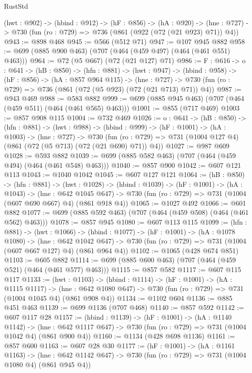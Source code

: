 \begin{lexlean}{RustStd}
\begin{coremodule}
{\begin{coremodule}
{  (hwt : @902) ->
  (hbind : @912) ->
  (hF : @856) ->
  (hA : @920) ->
  (hne : @727) -> @730 (fun (ro : @729) => @736 (@861 (@922 (@72 (@21 @923) @71)) @4))
@943 := @898 @468
@945 := @566 (@512 @71)
@947 := @107 @945 @882
@958 := @699 (@885 @900 @463) (@707 (@464 (@459 @497) (@464 (@461 @551) @463)))
@964 := @72 (@5 @667) (@72 (@21 @127) @71)
@986 := {F : @616} ->
  {o : @641} ->
  (hB : @850) ->
  (hfn : @881) ->
  (hwt : @947) ->
  (hbind : @958) ->
  (hF : @856) ->
  (hA : @857 @964 @115) ->
  (hne : @727) -> @730 (fun (ro : @729) => @736 (@861 (@72 (@5 @923) (@72 (@21 @713) @71)) @4))
@987 := @943 @469
@988 := @583 @882
@999 := @699 (@885 @945 @463) (@707 (@464 (@459 @511) (@464 (@461 @565) @463)))
@1001 := @855 (@717 @469)
@1003 := @857 @908 @115
@1004 := @732 @469
@1026 := {o : @641} ->
  (hB : @850) ->
  (hfn : @881) ->
  (hwt : @988) ->
  (hbind : @999) ->
  (hF : @1001) ->
  (hA : @1003) ->
  (hne : @727) ->
  @730 (fun (ro : @729) => @731 (@1004 @127 @4) (@861 (@72 (@5 @713) (@72 (@21 @690) @71)) @4))
@1027 := @987 @609
@1028 := @593 @882
@1039 := @699 (@885 @582 @463) (@707 (@464 (@459 @494) (@464 (@461 @548) @463)))
@1040 := @857 @900
@1042 := @607 @121 @113
@1043 := @1040 @1042
@1045 := @607 @127 @121
@1064 := (hB : @850) ->
  (hfn : @881) ->
  (hwt : @1028) ->
  (hbind : @1039) ->
  (hF : @1001) ->
  (hA : @1043) ->
  (hne : @642 @1045 @647) ->
  @730 (fun (ro : @729) => @731 (@1004 (@607 @690 @667) @4) (@861 @918 @4))
@1065 := @1027 @492
@1066 := @601 @882
@1077 := @699 (@885 @592 @463) (@707 (@464 (@459 @508) (@464 (@461 @562) @463)))
@1078 := @857 @945
@1080 := @607 @113 @115
@1099 := (hfn : @881) ->
  (hwt : @1066) ->
  (hbind : @1077) ->
  (hF : @1001) ->
  (hA : @1078 @1080) ->
  (hne : @642 @1042 @647) ->
  @730 (fun (ro : @729) => @731 (@1004 (@607 @667 @127) @4) (@861 @964 @4))
@1102 := @1065 (@428 @674 @851)
@1103 := @605 @882
@1114 := @699 (@885 @600 @463) (@707 (@464 (@459 @521) (@464 (@461 @577) @463)))
@1115 := @857 @582
@1117 := @607 @115 @117
@1133 := (hwt : @1103) ->
  (hbind : @1114) ->
  (hF : @1001) ->
  (hA : @1115 @1117) ->
  (hne : @642 @1080 @647) -> @730 (fun (ro : @729) => @731 (@1004 @1045 @4) (@861 @908 @4))
@1134 := @1102 @604
@1136 := @885 @451 @463
@1139 := @699 @1136 (@707 @468)
@1140 := @857 @592
@1142 := @607 @117 @28
@1157 := (hbind : @1139) ->
  (hF : @1001) ->
  (hA : @1140 @1142) ->
  (hne : @642 @1117 @647) -> @730 (fun (ro : @729) => @731 (@1004 @1042 @4) (@861 @900 @4))
@1160 := @1134 (@428 @698 @1136)
@1161 := @857 @600
@1163 := @607 @28 @30
@1177 := (hF : @1001) ->
  (hA : @1161 @1163) ->
  (hne : @642 @1142 @647) -> @730 (fun (ro : @729) => @731 (@1004 @1080 @4) (@861 @945 @4))
}
\end{coremodule}}
\end{coremodule}
\end{lexlean}
